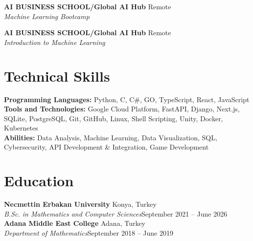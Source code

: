 \documentclass[10pt,a4paper]{extarticle}
\begin{document}
\vspace{5pt}
\noindent\textbf{AI BUSINESS SCHOOL/Global AI Hub} \hfill Remote\\
\textit{Machine Learning Bootcamp}

\vspace{5pt}
\noindent\textbf{AI BUSINESS SCHOOL/Global AI Hub} \hfill Remote\\
\textit{Introduction to Machine Learning}

\vspace{4pt}

\section{Technical Skills}
\textbf{Programming Languages:} Python, C, C\#, GO, TypeScript, React, JavaScript\\
\textbf{Tools and Technologies:} Google Cloud Platform, FastAPI, Django, Next.js, SQLite, PostgreSQL, Git, GitHub, Linux, Shell Scripting, Unity, Docker, Kubernetes\\
\textbf{Abilities:} Data Analysis, Machine Learning, Data Visualization, SQL, Cybersecurity, API Development \& Integration, Game Development

\vspace{4pt}

\section{Education}
\textbf{Necmettin Erbakan University} \hfill Konya, Turkey\\
\textit{B.Sc. in Mathematics and Computer Sciences}\hfill September 2021 -- June 2026 \\

\vspace{2pt}
\noindent\textbf{Adana Middle East College} \hfill Adana, Turkey\\
\textit{Department of Mathematics}\hfill September 2018 -- June 2019\\
\end{document}
